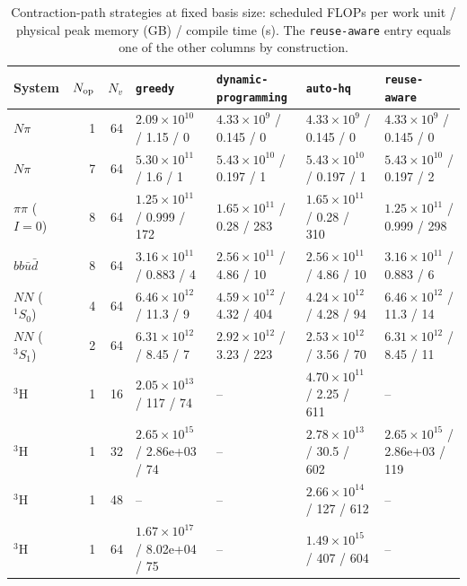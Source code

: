 \documentclass[a4paper,fleqn]{cas-dc}
\begin{document}
\begin{table}[t]
\centering
\caption{Contraction-path strategies at fixed basis size: scheduled FLOPs per work
unit / physical peak memory (GB) / compile time (s). The \texttt{reuse-aware} entry
equals one of the other columns by construction.}
\label{tab:strategies}
\footnotesize
\setlength{\tabcolsep}{3pt}
\begin{tabular}{@{}lrrllll@{}}
\toprule
System & \(N_{\rm op}\) & \(N_v\) & \texttt{greedy} & \texttt{dynamic-programming} & \texttt{auto-hq} & \texttt{reuse-aware} \\
\midrule
$N\pi$ & 1 & 64 & \(2.09\times10^{10}\) / 1.15 / 0 & \(4.33\times10^{9}\) / 0.145 / 0 & \(4.33\times10^{9}\) / 0.145 / 0 & \(4.33\times10^{9}\) / 0.145 / 0 \\
$N\pi$ & 7 & 64 & \(5.30\times10^{11}\) / 1.6 / 1 & \(5.43\times10^{10}\) / 0.197 / 1 & \(5.43\times10^{10}\) / 0.197 / 1 & \(5.43\times10^{10}\) / 0.197 / 2 \\
$\pi\pi$ ($I=0$) & 8 & 64 & \(1.25\times10^{11}\) / 0.999 / 172 & \(1.65\times10^{11}\) / 0.28 / 283 & \(1.65\times10^{11}\) / 0.28 / 310 & \(1.25\times10^{11}\) / 0.999 / 298 \\
$bb\bar u\bar d$ & 8 & 64 & \(3.16\times10^{11}\) / 0.883 / 4 & \(2.56\times10^{11}\) / 4.86 / 10 & \(2.56\times10^{11}\) / 4.86 / 10 & \(3.16\times10^{11}\) / 0.883 / 6 \\
$NN$ ($^1S_0$) & 4 & 64 & \(6.46\times10^{12}\) / 11.3 / 9 & \(4.59\times10^{12}\) / 4.32 / 404 & \(4.24\times10^{12}\) / 4.28 / 94 & \(6.46\times10^{12}\) / 11.3 / 14 \\
$NN$ ($^3S_1$) & 2 & 64 & \(6.31\times10^{12}\) / 8.45 / 7 & \(2.92\times10^{12}\) / 3.23 / 223 & \(2.53\times10^{12}\) / 3.56 / 70 & \(6.31\times10^{12}\) / 8.45 / 11 \\
$^3$H & 1 & 16 & \(2.05\times10^{13}\) / 117 / 74 & -- & \(4.70\times10^{11}\) / 2.25 / 611 & -- \\
$^3$H & 1 & 32 & \(2.65\times10^{15}\) / 2.86e+03 / 74 & -- & \(2.78\times10^{13}\) / 30.5 / 602 & \(2.65\times10^{15}\) / 2.86e+03 / 119 \\
$^3$H & 1 & 48 & -- & -- & \(2.66\times10^{14}\) / 127 / 612 & -- \\
$^3$H & 1 & 64 & \(1.67\times10^{17}\) / 8.02e+04 / 75 & -- & \(1.49\times10^{15}\) / 407 / 604 & -- \\
\bottomrule
\end{tabular}
\end{table}
\end{document}
